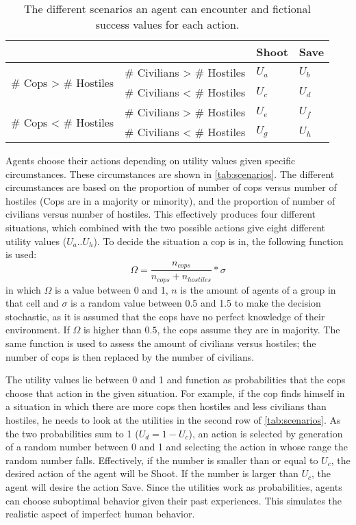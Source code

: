 \begin{table}[H]
	\begin{center}
		\begin{tabular}{l l | l l}
			\hline
			& & Shoot & Save \\
			\hline
			\multirow{2}{*}{\# Cops > \# Hostiles} 
			& {\# Civilians > \# Hostiles} & $U_a$ & $U_b$ \\
			& {\# Civilians < \# Hostiles} & $U_c$ & $U_d$ \\
			\hline
			\multirow{2}{*}{\# Cops < \# Hostiles} 
			& {\# Civilians > \# Hostiles} & $U_e$ & $U_f$ \\
			& {\# Civilians < \# Hostiles} & $U_g$ & $U_h$ \\
			\hline
		\end{tabular}
		\caption{The different scenarios an agent can encounter and fictional success values for each action.
		}
		\label{tab:scenarios}
	\end{center}
\end{table}
\noindent Agents choose their actions depending on utility values given specific circumstances.
These circumstances are shown in \autoref{tab:scenarios}.
The different circumstances are based on the proportion of number of cops versus number of hostiles (Cops are in a majority or minority), 
and the proportion of number of civilians versus number of hostiles. 
This effectively produces four different situations, which combined with the two possible actions give eight different utility values ($U_a..U_h$).
To decide the situation a cop is in, the following function is used:
\begin{equation} \label{eq:omega}
\Omega = \frac{n_{cops}}{n_{cops} + n_{hostiles}}*\sigma 
\end{equation}
in which $\Omega$ is a value between 0 and 1, $n$ is the amount of agents of a group in that cell and $\sigma$ is a random value between 0.5 and 1.5 to make the decision stochastic, as it is assumed that the cops have no perfect knowledge of their environment.
If $\Omega$ is higher than $0.5$, the cops assume they are in majority.
The same function is used to assess the amount of civilians versus hostiles; the number of cops is then replaced by the number of civilians.

The utility values lie between 0 and 1 and function as probabilities that the cops choose that action in the given situation. For example, if the cop finds himself in a situation in which there are more cops then hostiles and less civilians than hostiles, he needs to look at the utilities in the second row of \autoref{tab:scenarios}. 
As the two probabilities sum to 1 ($U_d = 1 - U_c$), 
an action is selected by generation of a random number between 0 and 1 and selecting the action in whose range the random number falls.
Effectively, if the number is smaller than or equal to $U_c$, the desired action of the agent will be Shoot.
If the number is larger than $U_c$, the agent will desire the action Save.
Since the utilities work as probabilities, agents can choose suboptimal behavior given their past experiences. This simulates the realistic aspect of imperfect human behavior. 

